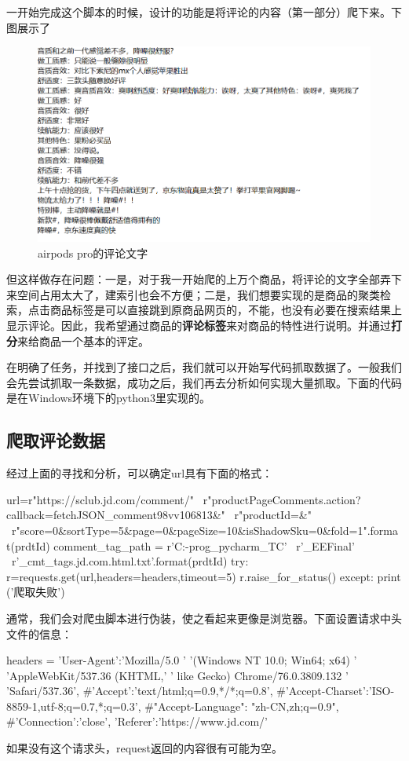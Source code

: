 一开始完成这个脚本的时候，设计的功能是将评论的内容（第一部分）爬下来。下图展示了
\begin{figure}[htbp]
\centering
\includegraphics[width=13.5cm]{cmt contents eg jd.png}
\caption{airpods pro的评论文字} %
\end{figure}
但这样做存在问题：一是，对于我一开始爬的上万个商品，将评论的文字全部弄下来空间占用太大了，建索引也会不方便；二是，我们想要实现的是商品的聚类检索，点击商品标签是可以直接跳到原商品网页的，不能，也没有必要在搜索结果上显示评论。因此，我希望通过商品的\textbf{评论标签}来对商品的特性进行说明。并通过\textbf{打分}来给商品一个基本的评定。

在明确了任务，并找到了接口之后，我们就可以开始写代码抓取数据了。一般我们会先尝试抓取一条数据，成功之后，我们再去分析如何实现大量抓取。下面的代码是在Windows环境下的python3里实现的。

\subsection{爬取评论数据}
经过上面的寻找和分析，可以确定url具有下面的格式：
\begin{python}
url=r"https://sclub.jd.com/comment/" \
    r"productPageComments.action?callback=fetchJSON_comment98vv106813&" \
    r"productId={}&" \
    r"score=0&sortType=5&page=0&pageSize=10&isShadowSku=0&fold=1".format(prdtId)
comment_tag_path = r'C:\TC-prog\JetBrain_pycharm_TC' \
                   r'\PycharmProjects\Crawler_EEFinal' \
                   r'\jd_cmt_tags\httpsitem.jd.com{}.html.txt'.format(prdtId)
try:
    r=requests.get(url,headers=headers,timeout=5)
    r.raise_for_status()
except:
    print ('爬取失败')
\end{python}
通常，我们会对爬虫脚本进行伪装，使之看起来更像是浏览器。下面设置请求中头文件的信息：
\begin{python}
headers = {'User-Agent':'Mozilla/5.0 '
                        '(Windows NT 10.0; Win64; x64) '
                        'AppleWebKit/537.36 (KHTML,'
                        ' like Gecko) Chrome/76.0.3809.132 '
                        'Safari/537.36',
#'Accept':'text/html;q=0.9,*/*;q=0.8',
#'Accept-Charset':'ISO-8859-1,utf-8;q=0.7,*;q=0.3',
#"Accept-Language": "zh-CN,zh;q=0.9",
#'Connection':'close',
'Referer':'https://www.jd.com/'
}
\end{python}
如果没有这个请求头，request返回的内容很有可能为空。

